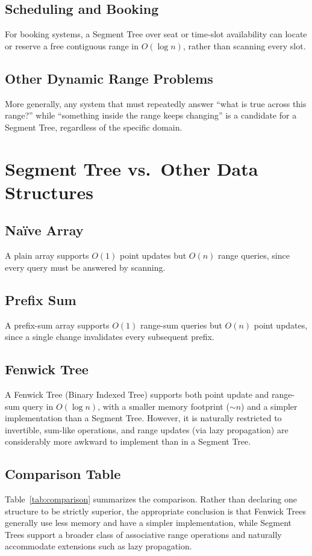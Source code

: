 \documentclass[11pt]{article}
\begin{document}
\subsection{Scheduling and Booking}
For booking systems, a Segment Tree over seat or time-slot availability can locate or reserve a free contiguous range in $O(\log n)$, rather than scanning every slot.

\subsection{Other Dynamic Range Problems}
More generally, any system that must repeatedly answer ``what is true across this range?'' while ``something inside the range keeps changing'' is a candidate for a Segment Tree, regardless of the specific domain.

\section{Segment Tree vs.\ Other Data Structures}

\subsection{Na\"ive Array}
A plain array supports $O(1)$ point updates but $O(n)$ range queries, since every query must be answered by scanning.

\subsection{Prefix Sum}
A prefix-sum array supports $O(1)$ range-sum queries but $O(n)$ point updates, since a single change invalidates every subsequent prefix.

\subsection{Fenwick Tree}
A Fenwick Tree (Binary Indexed Tree) supports both point update and range-sum query in $O(\log n)$, with a smaller memory footprint ($\sim n$) and a simpler implementation than a Segment Tree. However, it is naturally restricted to invertible, sum-like operations, and range updates (via lazy propagation) are considerably more awkward to implement than in a Segment Tree.

\subsection{Comparison Table}
Table~\ref{tab:comparison} summarizes the comparison. Rather than declaring one structure to be strictly superior, the appropriate conclusion is that Fenwick Trees generally use less memory and have a simpler implementation, while Segment Trees support a broader class of associative range operations and naturally accommodate extensions such as lazy propagation.
\end{document}
